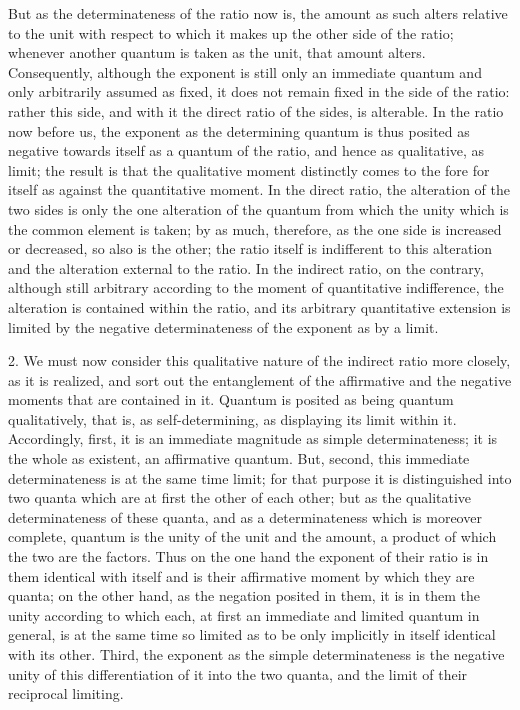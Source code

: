 But as the determinateness of the ratio now is,
the amount as such alters relative to the unit
with respect to which it makes up the other side of the ratio;
whenever another quantum is taken as the unit,
that amount alters.
Consequently, although the exponent is
still only an immediate quantum
and only arbitrarily assumed as fixed,
it does not remain fixed in the side of the ratio:
rather this side, and with it
the direct ratio of the sides, is alterable.
In the ratio now before us,
the exponent as the determining quantum is
thus posited as negative towards itself
as a quantum of the ratio,
and hence as qualitative, as limit;
the result is that the qualitative moment distinctly comes
to the fore for itself as against the quantitative moment.
In the direct ratio, the alteration of the two sides is
only the one alteration of the quantum
from which the unity which is the common element is taken;
by as much, therefore, as the one side is
increased or decreased, so also is the other;
the ratio itself is indifferent to this alteration
and the alteration external to the ratio.
In the indirect ratio, on the contrary,
although still arbitrary according to
the moment of quantitative indifference,
the alteration is contained within the ratio,
and its arbitrary quantitative extension is
limited by the negative determinateness
of the exponent as by a limit.

2. We must now consider this qualitative nature
of the indirect ratio more closely, as it is realized,
and sort out the entanglement of the affirmative
and the negative moments that are contained in it.
Quantum is posited as being quantum qualitatively,
that is, as self-determining,
as displaying its limit within it.
Accordingly, first, it is an immediate magnitude
as simple determinateness;
it is the whole as existent, an affirmative quantum.
But, second, this immediate determinateness is
at the same time limit;
for that purpose it is distinguished into two quanta
which are at first the other of each other;
but as the qualitative determinateness of these quanta,
and as a determinateness which is moreover complete,
quantum is the unity of the unit and the amount,
a product of which the two are the factors.
Thus on the one hand the exponent of their ratio
is in them identical with itself
and is their affirmative moment by which they are quanta;
on the other hand, as the negation posited in them,
it is in them the unity according to which each,
at first an immediate and limited quantum in general,
is at the same time so limited as to be
only implicitly in itself identical with its other.
Third, the exponent as the simple determinateness is
the negative unity of this differentiation of it into the two quanta,
and the limit of their reciprocal limiting.

